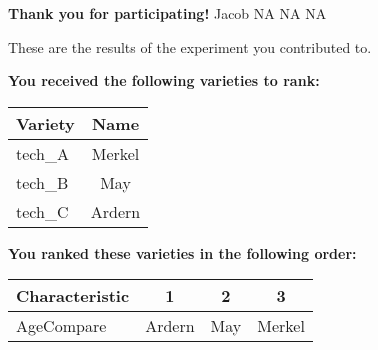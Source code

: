 \documentclass[10pt]{article}
\begin{document}
\begin{titlepage}
\setlength{\voffset}{-0.5in}
\setlength{\parindent}{1em}
\setlength{\parskip}{1em}
\renewcommand{\baselinestretch}{1.5}
\rmfamily




	\textbf{Thank you for participating!}
	\newline
	\newline
	Jacob \newline
	NA \newline
	NA \newline
	NA \newline


	These are the results of the experiment you contributed to.

	\begin{flushleft}
		\textbf{You received the following varieties to rank: }\hfill \break
		\begin{tabularx}{\textwidth}{ X | c  }
			\hline
			\textbf{Variety} & \textbf{Name} \\ \hline

			
				tech\_A & Merkel \\ \hline
			
				tech\_B & May \\ \hline
			
				tech\_C & Ardern \\ \hline
			


		\end{tabularx}\newline \newline

		\textbf{You ranked these varieties in the following order: }\hfill \break
		\begin{tabularx}{\textwidth}{ X | c | c | c  }
			\hline
			\textbf{Characteristic}
			
				& \textbf{ 1 }
			
				& \textbf{ 2 }
			
				& \textbf{ 3 }
			
			\\ \hline


			
				AgeCompare & Ardern  & May  & Merkel  \\ \hline



\end{tabularx}
\end{flushleft}
\end{titlepage}
\end{document}
